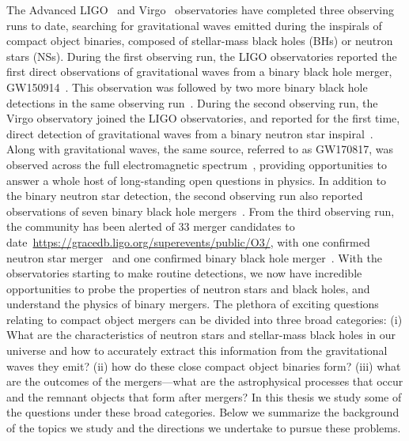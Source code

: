 The Advanced LIGO~\cite{TheLIGOScientific:2014jea} and
Virgo~\cite{TheVirgo:2014hva} observatories have completed three observing runs to date, searching for gravitational waves emitted during the inspirals of compact object
binaries, composed of stellar-mass black holes (BHs) or neutron stars (NSs). During the first observing run, the LIGO observatories reported the first direct observations of gravitational waves from a binary black hole merger, GW150914~\cite{Abbott:2016blz}. This observation was followed by two more binary black hole detections in the same observing run~\cite{TheLIGOScientific:2016pea}. During the second observing run, the Virgo observatory joined the LIGO observatories, and reported for the first time, direct detection of gravitational waves from a binary neutron star inspiral~\cite{TheLIGOScientific:2017qsa}. Along with gravitational waves, the same source, referred to as GW170817, was observed across the full electromagnetic spectrum~\cite{GBM:2017lvd}, providing opportunities to answer a whole host of long-standing open questions in physics. In addition to the binary neutron star detection, the second observing run also reported observations of seven binary black hole mergers~\cite{TheLIGOScientific:2014jea,Abbott:2017vtc,Abbott:2017gyy,LIGOScientific:2018mvr,LIGOScientific:2018mvr,LIGOScientific:2018mvr,Abbott:2017oio,LIGOScientific:2018mvr}. From the third observing run, the community has been alerted of 33 merger candidates to date~\url{https://gracedb.ligo.org/superevents/public/O3/}, with one confirmed neutron star merger~\cite{abbott_gw190425_2020} and one confirmed binary black hole merger~\cite{LIGOScientific:2020stg}. With the observatories starting to make routine detections, we now have incredible opportunities to probe the properties of neutron stars and black holes, and understand the physics of binary mergers. The plethora of exciting questions relating to compact object mergers can be divided into three broad categories: (i) What are the characteristics of neutron stars and stellar-mass black holes in our universe and how to accurately extract this information from the gravitational waves they emit? (ii) how do these close compact object binaries form? (iii) what are the outcomes of the mergers---what are the astrophysical processes that occur and the remnant objects that form after mergers? In this thesis we study some of the questions under these broad categories. Below we summarize the background of the topics we study and the directions we undertake to pursue these problems.

